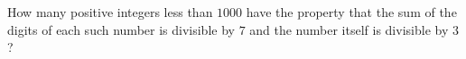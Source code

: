 How many positive integers less than $1000$ have the property that the sum of the digits of each such number is divisible by $7$ and the number itself is divisible by $3$?
